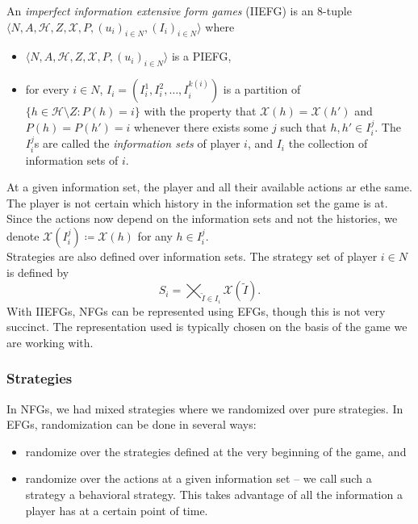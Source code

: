 	\begin{fdef}
		An \emph{imperfect information extensive form games} (IIEFG) is an $8$-tuple $\langle N,A,\mathcal{H},Z,\mathcal{X},P,(u_i)_{i\in N},(I_i)_{i \in N}\rangle$ where
		\begin{itemize}
			\item $\langle N,A,\mathcal{H},Z,\mathcal{X},P,(u_i)_{i\in N}\rangle$ is a PIEFG,
			\item for every $i \in N$, $I_i = (I_i^1,I_i^2,\ldots,I_i^{k(i)})$ is a partition of $\{ h \in \mathcal{H} \setminus Z : P(h) = i \}$ with the property that $\mathcal{X}(h) = \mathcal{X}(h')$ and $P(h) = P(h') = i$ whenever there exists some $j$ such that $h,h' \in I_i^j$. The $I_i^j$s are called the \emph{information sets} of player $i$, and $I_i$ the collection of information sets of $i$.
		\end{itemize}
	\end{fdef}

	At a given information set, the player and all their available actions ar ethe same. The player is not certain which history in the information set the game is at.\\
	Since the actions now depend on the information sets and not the histories, we denote $\mathcal{X}(I_i^j) \coloneqq \mathcal{X}(h)$ for any $h \in I_i^j$.\\
	Strategies are also defined over information sets. The strategy set of player $i \in N$ is defined by
	\[ S_i = \bigtimes_{\tilde{I} \in I_i} \mathcal{X}(\tilde{I}). \]
	With IIEFGs, NFGs can be represented using EFGs, though this is not very succinct. The representation used is typically chosen on the basis of the game we are working with.

	\subsubsection{Strategies}

		In NFGs, we had mixed strategies where we randomized over pure strategies. In EFGs, randomization can be done in several ways:
		\begin{itemize}
			\item randomize over the strategies defined at the very beginning of the game, and
			\item randomize over the actions at a given information set -- we call such a strategy a behavioral strategy. This takes advantage of all the information a player has at a certain point of time.
		\end{itemize}

